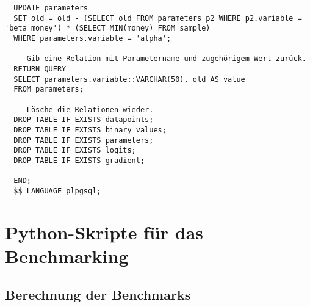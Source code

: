 \begin{verbatim}
  UPDATE parameters
  SET old = old - (SELECT old FROM parameters p2 WHERE p2.variable = 'beta_money') * (SELECT MIN(money) FROM sample)
  WHERE parameters.variable = 'alpha';

  -- Gib eine Relation mit Parametername und zugehörigem Wert zurück.
  RETURN QUERY
  SELECT parameters.variable::VARCHAR(50), old AS value
  FROM parameters;

  -- Lösche die Relationen wieder.
  DROP TABLE IF EXISTS datapoints;
  DROP TABLE IF EXISTS binary_values;
  DROP TABLE IF EXISTS parameters;
  DROP TABLE IF EXISTS logits;
  DROP TABLE IF EXISTS gradient;

  END;
  $$ LANGUAGE plpgsql;
\end{verbatim}

\chapter{Python-Skripte für das Benchmarking}
\label{appendix:F}

\section{Berechnung der Benchmarks}
\label{appendix:F:1}

